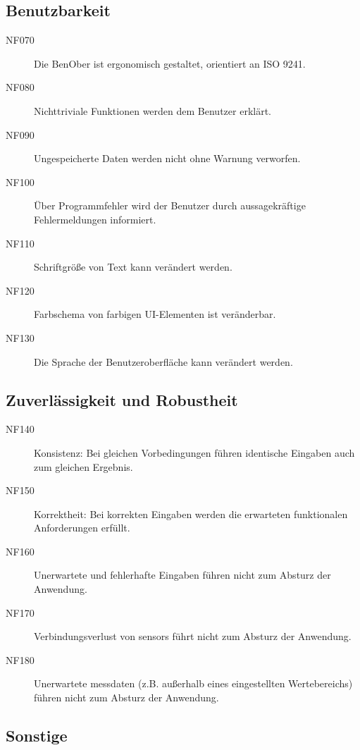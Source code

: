 \documentclass[parskip=full]{scrartcl}
\begin{document}
\subsection{Benutzbarkeit}

\begin{description}

\item[NF070] Die \gls{BenOber} ist ergonomisch gestaltet, orientiert an ISO 9241.
\item[NF080] Nichttriviale Funktionen werden dem Benutzer erklärt.
\item[NF090] Ungespeicherte Daten werden nicht ohne Warnung verworfen.
\item[NF100] Über Programmfehler wird der Benutzer durch aussagekräftige Fehlermeldungen informiert.
\item[NF110] Schriftgröße von Text kann verändert werden.
\item[NF120] Farbschema von farbigen \gls{UI}-Elementen ist veränderbar.
\item[NF130] Die Sprache der Benutzeroberfläche kann verändert werden.

\end{description}

\subsection{Zuverlässigkeit und Robustheit}

\begin{description}

\item[NF140] Konsistenz: Bei gleichen Vorbedingungen führen identische Eingaben auch zum gleichen Ergebnis.
\item[NF150] Korrektheit: Bei korrekten Eingaben werden die erwarteten funktionalen Anforderungen erfüllt.
\item[NF160] Unerwartete und fehlerhafte Eingaben führen nicht zum Absturz der Anwendung.
\item[NF170] Verbindungsverlust von \glspl{sensor} führt nicht zum Absturz der Anwendung.
\item[NF180] Unerwartete \gls{messdaten} (z.B. außerhalb eines eingestellten Wertebereichs) führen nicht zum Absturz der Anwendung.

\end{description}

\subsection{Sonstige}
\end{document}

